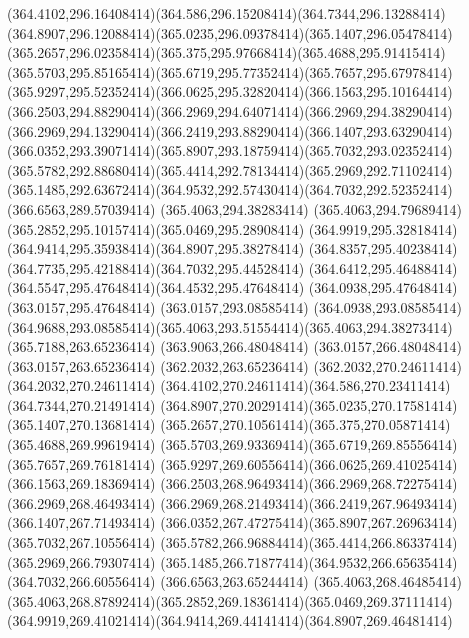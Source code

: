 {{	\curveto(364.4102,296.16408414)(364.586,296.15208414)(364.7344,296.13288414)
	\curveto(364.8907,296.12088414)(365.0235,296.09378414)(365.1407,296.05478414)
	\curveto(365.2657,296.02358414)(365.375,295.97668414)(365.4688,295.91415414)
	\curveto(365.5703,295.85165414)(365.6719,295.77352414)(365.7657,295.67978414)
	\curveto(365.9297,295.52352414)(366.0625,295.32820414)(366.1563,295.10164414)
	\curveto(366.2503,294.88290414)(366.2969,294.64071414)(366.2969,294.38290414)
	\curveto(366.2969,294.13290414)(366.2419,293.88290414)(366.1407,293.63290414)
	\curveto(366.0352,293.39071414)(365.8907,293.18759414)(365.7032,293.02352414)
	\curveto(365.5782,292.88680414)(365.4414,292.78134414)(365.2969,292.71102414)
	\curveto(365.1485,292.63672414)(364.9532,292.57430414)(364.7032,292.52352414)
	\lineto(366.6563,289.57039414)
	\closepath
	\moveto(365.4063,294.38283414)
	\curveto(365.4063,294.79689414)(365.2852,295.10157414)(365.0469,295.28908414)
	\curveto(364.9919,295.32818414)(364.9414,295.35938414)(364.8907,295.38278414)
	\curveto(364.8357,295.40238414)(364.7735,295.42188414)(364.7032,295.44528414)
	\curveto(364.6412,295.46488414)(364.5547,295.47648414)(364.4532,295.47648414)
	\lineto(364.0938,295.47648414)
	\lineto(363.0157,295.47648414)
	\lineto(363.0157,293.08585414)
	\lineto(364.0938,293.08585414)
	\curveto(364.9688,293.08585414)(365.4063,293.51554414)(365.4063,294.38273414)
	\closepath
	\moveto(365.7188,263.65236414)
	\lineto(363.9063,266.48048414)
	\lineto(363.0157,266.48048414)
	\lineto(363.0157,263.65236414)
	\lineto(362.2032,263.65236414)
	\lineto(362.2032,270.24611414)
	\lineto(364.2032,270.24611414)
	\curveto(364.4102,270.24611414)(364.586,270.23411414)(364.7344,270.21491414)
	\curveto(364.8907,270.20291414)(365.0235,270.17581414)(365.1407,270.13681414)
	\curveto(365.2657,270.10561414)(365.375,270.05871414)(365.4688,269.99619414)
	\curveto(365.5703,269.93369414)(365.6719,269.85556414)(365.7657,269.76181414)
	\curveto(365.9297,269.60556414)(366.0625,269.41025414)(366.1563,269.18369414)
	\curveto(366.2503,268.96493414)(366.2969,268.72275414)(366.2969,268.46493414)
	\curveto(366.2969,268.21493414)(366.2419,267.96493414)(366.1407,267.71493414)
	\curveto(366.0352,267.47275414)(365.8907,267.26963414)(365.7032,267.10556414)
	\curveto(365.5782,266.96884414)(365.4414,266.86337414)(365.2969,266.79307414)
	\curveto(365.1485,266.71877414)(364.9532,266.65635414)(364.7032,266.60556414)
	\lineto(366.6563,263.65244414)
	\closepath
	\moveto(365.4063,268.46485414)
	\curveto(365.4063,268.87892414)(365.2852,269.18361414)(365.0469,269.37111414)
	\curveto(364.9919,269.41021414)(364.9414,269.44141414)(364.8907,269.46481414)
}}
